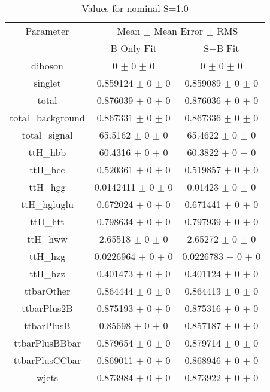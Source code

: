\begin{table}
\centering
\caption{Values for nominal S=1.0}
\begin{tabular}{ccc}
\toprule
Parameter 	& \multicolumn{2}{c}{Mean $\pm$ Mean Error $\pm$ RMS}\\
 	& B-Only Fit & S+B Fit\\
\midrule
diboson 	& \num{0} $\pm$ \num{0} $\pm$ \num{0} 	& \num{0} $\pm$ \num{0} $\pm$ \num{0}\\
singlet 	& \num{0.859124} $\pm$ \num{0} $\pm$ \num{0} 	& \num{0.859089} $\pm$ \num{0} $\pm$ \num{0}\\
total 	& \num{0.876039} $\pm$ \num{0} $\pm$ \num{0} 	& \num{0.876036} $\pm$ \num{0} $\pm$ \num{0}\\
total\_background 	& \num{0.867331} $\pm$ \num{0} $\pm$ \num{0} 	& \num{0.867336} $\pm$ \num{0} $\pm$ \num{0}\\
total\_signal 	& \num{65.5162} $\pm$ \num{0} $\pm$ \num{0} 	& \num{65.4622} $\pm$ \num{0} $\pm$ \num{0}\\
ttH\_hbb 	& \num{60.4316} $\pm$ \num{0} $\pm$ \num{0} 	& \num{60.3822} $\pm$ \num{0} $\pm$ \num{0}\\
ttH\_hcc 	& \num{0.520361} $\pm$ \num{0} $\pm$ \num{0} 	& \num{0.519857} $\pm$ \num{0} $\pm$ \num{0}\\
ttH\_hgg 	& \num{0.0142411} $\pm$ \num{0} $\pm$ \num{0} 	& \num{0.01423} $\pm$ \num{0} $\pm$ \num{0}\\
ttH\_hgluglu 	& \num{0.672024} $\pm$ \num{0} $\pm$ \num{0} 	& \num{0.671441} $\pm$ \num{0} $\pm$ \num{0}\\
ttH\_htt 	& \num{0.798634} $\pm$ \num{0} $\pm$ \num{0} 	& \num{0.797939} $\pm$ \num{0} $\pm$ \num{0}\\
ttH\_hww 	& \num{2.65518} $\pm$ \num{0} $\pm$ \num{0} 	& \num{2.65272} $\pm$ \num{0} $\pm$ \num{0}\\
ttH\_hzg 	& \num{0.0226964} $\pm$ \num{0} $\pm$ \num{0} 	& \num{0.0226783} $\pm$ \num{0} $\pm$ \num{0}\\
ttH\_hzz 	& \num{0.401473} $\pm$ \num{0} $\pm$ \num{0} 	& \num{0.401124} $\pm$ \num{0} $\pm$ \num{0}\\
ttbarOther 	& \num{0.864444} $\pm$ \num{0} $\pm$ \num{0} 	& \num{0.864413} $\pm$ \num{0} $\pm$ \num{0}\\
ttbarPlus2B 	& \num{0.875193} $\pm$ \num{0} $\pm$ \num{0} 	& \num{0.875316} $\pm$ \num{0} $\pm$ \num{0}\\
ttbarPlusB 	& \num{0.85698} $\pm$ \num{0} $\pm$ \num{0} 	& \num{0.857187} $\pm$ \num{0} $\pm$ \num{0}\\
ttbarPlusBBbar 	& \num{0.879654} $\pm$ \num{0} $\pm$ \num{0} 	& \num{0.879714} $\pm$ \num{0} $\pm$ \num{0}\\
ttbarPlusCCbar 	& \num{0.869011} $\pm$ \num{0} $\pm$ \num{0} 	& \num{0.868946} $\pm$ \num{0} $\pm$ \num{0}\\
wjets 	& \num{0.873984} $\pm$ \num{0} $\pm$ \num{0} 	& \num{0.873922} $\pm$ \num{0} $\pm$ \num{0}\\
\bottomrule
\end{tabular}
\end{table}